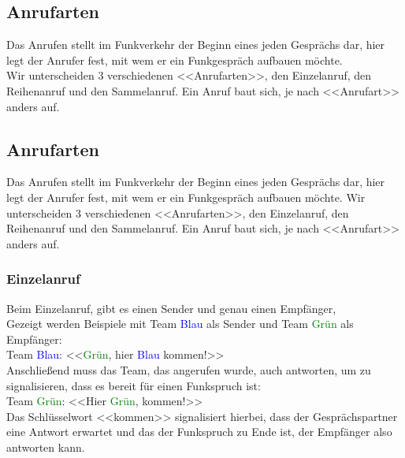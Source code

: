 \subsection{Anrufarten} 
	Das Anrufen stellt im Funkverkehr der Beginn eines jeden Gesprächs dar, hier legt der Anrufer fest, mit wem er ein Funkgespräch aufbauen möchte. \\
	Wir unterscheiden 3 verschiedenen <<Anrufarten>>, den Einzelanruf, den Reihenanruf und den Sammelanruf. Ein Anruf baut sich, je nach <<Anrufart>> anders auf. \\

\subsection{ Anrufarten}
	Das Anrufen stellt im Funkverkehr der Beginn eines jeden Gesprächs dar, hier legt der Anrufer fest, mit wem er ein Funkgespräch aufbauen möchte. Wir unterscheiden 3 verschiedenen <<Anrufarten>>, den Einzelanruf, den Reihenanruf und den Sammelanruf. Ein Anruf baut sich, je nach <<Anrufart>> anders auf. \\

\subsubsection{Einzelanruf}
	Beim Einzelanruf, gibt es einen Sender und genau einen Empfänger, \\
	Gezeigt werden Beispiele mit Team \textcolor{blue}{Blau} als Sender und Team \textcolor{green}{Grün} als Empfänger: \\
	Team \textcolor{blue}{Blau}: <<\textcolor{green}{Grün}, hier \textcolor{blue}{Blau} kommen!>> \\
	Anschließend muss das Team, das angerufen wurde, auch antworten, um zu signalisieren, dass es bereit für einen Funkspruch ist: \\
	Team \textcolor{green}{Grün}: <<Hier \textcolor{green}{Grün}, kommen!>> \\
	Das Schlüsselwort <<kommen>> signalisiert hierbei, dass der Gesprächspartner eine Antwort erwartet und das der Funkspruch zu Ende ist, der Empfänger also antworten kann. \\

